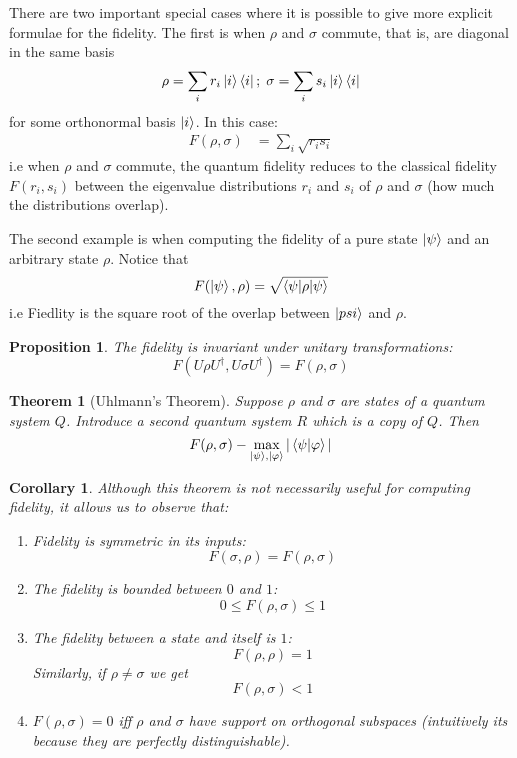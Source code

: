 \documentclass[11pt,a4paper]{article}
\theoremstyle{definition}
\theoremstyle{plain}
\newtheorem{theorem}[definition]{Theorem}
\newtheorem{proposition}[definition]{Proposition}
\newtheorem{corollary}[definition]{Corollary}
\theoremstyle{remark}
\begin{document}
There are two important special cases where it is possible to give more explicit formulae for the fidelity. The first is when $\rho$ and $\sigma$ commute, that is, are diagonal in the same basis 
$$\rho = \sum_{i} r_i \ket{i} \bra{i}; \; \sigma = \sum_i s_i \ket{i} \bra{i}$$
for some orthonormal basis $\ket{i}$. In this case: 
\begin{align*}
F(\rho, \sigma) &= \sum_i \sqrt{r_i s_i}
\end{align*}
i.e when $\rho$ and $\sigma$ commute, the quantum fidelity reduces to the classical fidelity $F(r_i, s_i)$ between the eigenvalue distributions $r_i$ and $s_i$ of 
$\rho$ and $\sigma$ (how much the distributions overlap).

The second example is when computing the fidelity of a pure state $\ket{\psi}$ and an arbitrary state 
$\rho$. Notice that 
$$F(\ket{\psi}, \rho) = \sqrt{\braket{\psi | \rho | \psi}}$$
i.e Fiedlity is the square root of the overlap between $\ket{psi}$ and $\rho$.

\begin{proposition}
The fidelity is invariant under unitary transformations: 
$$F(U \rho U^\dagger, U \sigma U^\dagger) = F(\rho, \sigma)$$
\end{proposition}

\begin{theorem}[Uhlmann's Theorem] \label{thm:fidelity-purification}
Suppose $\rho$ and $\sigma$ are states of a quantum system $Q$. Introduce a second quantum system $R$ 
which is a copy of $Q$. Then 
$$F(\rho, \sigma) - \max_{\ket{\psi}, \ket{\varphi}} |\braket{\psi | \varphi}|$$
\end{theorem}

\begin{corollary}
Although this theorem is not necessarily useful for computing fidelity, it allows us to observe that: 
\begin{enumerate}
\item Fidelity is symmetric in its inputs: 
$$F(\sigma, \rho) = F(\rho, \sigma)$$

\item The fidelity is bounded between $0$ and $1$: 
$$0 \leq F(\rho, \sigma) \leq 1$$

\item The fidelity between a state and itself is $1$: 
$$F(\rho, \rho) = 1$$
Similarly, if $\rho \neq \sigma$ we get 
$$F(\rho, \sigma) < 1$$

\item $F(\rho, \sigma) = 0$ iff $\rho$ and $\sigma$ have support on orthogonal subspaces (intuitively its because they are perfectly distinguishable).  
\end{enumerate}
\end{corollary}
\end{document}
